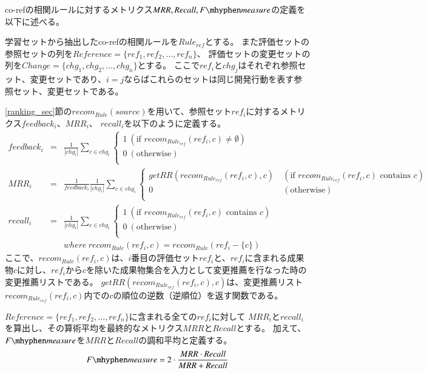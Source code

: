 \documentclass[a4paper]{jsbook}
\newcommand{\fmeasure}{F\mhyphen measure}
\begin{document}
co-refの相関ルールに対するメトリクス$MRR,Recall,\fmeasure$の定義を以下に述べる。

学習セットから抽出したco-refの相関ルールを$Rule_{ref}$とする。
また評価セットの参照セットの列を$Re\!f\!erence = \{ref_1, ref_2, \dots, ref_n\}$、
評価セットの変更セットの列を$Change = \{chg_1, chg_2, \dots, chg_n\}$とする。
ここで$ref_i$と$chg_j$はそれぞれ参照セット、変更セットであり、$i=j$ならばこれらのセットは同じ開発行動を表す参照セット、変更セットである。

\ref{ranking_sec}節の$recom_{Rule}(source)$を用いて、参照セット$ref_i$に対するメトリクス$feedback_i$、$MRR_i$、 $recall_i$を以下のように定義する。
\begin{eqnarray}
   feedback_i &=& \frac{1}{|chg_i|}
  \sum_{c \in chg_i}
  \left\{
  \begin{array}{ll}
    1 ~(\textrm{if~} recom_{Rule_{ref}}(ref_i,c) \neq \emptyset)\\
    0 ~(\textrm{otherwise})\\
  \end{array}
  \right.\\
  MRR_i &=& \frac{1}{feedback_i}\frac{1}{|chg_i|}
  \sum_{c \in chg_i}
  \left\{
  \begin{array}{ll}
    getRR\left( recom_{Rule_{ref}}(ref_i,c), c \right) 
    &~(\textrm{if~} recom_{Rule_{ref}}(ref_i,c) \textrm{~contains~} c)\\
    0 &~(\textrm{otherwise})\\
  \end{array}
  \right.\\
  recall_i &=& \frac{1} {|chg_i|} \sum_{c \in chg_i}
  \left\{
  \begin{array}{ll}
    1 ~(\textrm{if~} recom_{Rule_{ref}}(ref_i,c) \textrm{~contains~} c)\\
    0 ~(\textrm{otherwise})\\
  \end{array}
  \right.\\
           &~&where~recom_{Rule}(ref_i,c) = recom_{Rule}(ref_i - \{c\})
\end{eqnarray}
ここで、$recom_{Rule}(ref_i,c)$は、$i$番目の評価セット$ref_i$と、$ref_i$に含まれる成果物$c$に対し、$ref_i$から$c$を除いた成果物集合を入力として変更推薦を行なった時の変更推薦リストである。
$getRR\left( recom_{Rule_{ref}}(ref_i,c), c \right)$は、変更推薦リスト$recom_{Rule_{ref}}(ref_i,c)$内での$c$の順位の逆数（逆順位）を返す関数である。


$Re\!f\!erence = \{ref_1, ref_2, \dots, ref_n\}$に含まれる全ての$ref_i$に対して
$MRR_i$と$recall_i$を算出し、その算術平均を最終的なメトリクス$MRR$と$Recall$とする。
加えて、$\fmeasure$を$MRR$と$Recall$の調和平均と定義する。
\begin{equation}
  \fmeasure = 2\cdot\frac{MRR \cdot Recall}{MRR+Recall}
\end{equation}
\end{document}
